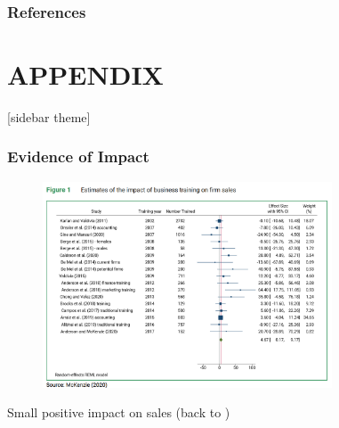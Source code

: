 \documentclass[hideothersubsections, usenames,dvipsnames,11pt]{beamer}
\newenvironment{itemize_2pt}{\itemize\addtolength{\itemsep}{2pt}}{\enditemize}
\begin{document}

\appendix
\begin{frame}[label=references, allowframebreaks]
\frametitle{References}


\end{frame}


\section*{\textbf{APPENDIX}}

[sidebar theme]



\begin{frame}[label=McK2020_sales]
\frametitle{Evidence of Impact}

	\begin{figure}[htbp]
		\centering
		\includegraphics[width=23.2em]{pics/McK2020_sales.png}
		\label{McKenzie(2020): Sales}
	\end{figure}	
	
	\vspace{-1em}	
	
	\begin{itemize_2pt}
		\item Small positive impact on sales (back to \hyperlink{McK2020_profits}{})
	\end{itemize_2pt}
	
\end{frame}
\end{document}
